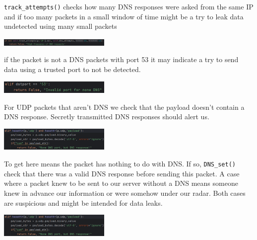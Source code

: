 \documentclass{article}
\begin{document}
\begin{itemize}
\begin{adjustwidth}{3em}{0em}
\begin{minipage}{\linewidth}
        \end{minipage}
        \texttt{track\_attempts()} checks how many DNS responses were asked from the same IP and if too many   packets in a small window of time might be a try to leak data undetected using many small packets \\
        \begin{minipage}{\linewidth}
            \includegraphics[width=0.4\textwidth]{test - dns 1.3.png}\hspace{3em}
        \end{minipage}
    \end{adjustwidth}

    if the packet is not a DNS packets with port 53 it may indicate a try to send data using a trusted port to not be detected. \\
    \begin{minipage}{\linewidth}
        \includegraphics[width=0.4\textwidth]{test - dns 2.png}\hspace{3em}
    \end{minipage}
    For UDP packets that aren’t DNS we check that the payload doesn’t contain a DNS response. Secretly transmitted DNS responses should alert us. \\
    \begin{minipage}{\linewidth}
        \includegraphics[width=0.4\textwidth]{test - dns 3.png}
    \end{minipage} 
    To get here means the packet has nothing to do with DNS. If so, \texttt{DNS\_set()} check that there was a valid DNS response before sending this packet. A case where a packet knew to be sent to our server without a DNS means someone knew in advance our information or were somehow under our radar. Both cases are suspicious and might be intended for data leaks. \\
    \begin{minipage}{\linewidth}
        \includegraphics[width=0.4\textwidth]{test - dns 3.png}

\end{minipage}
\end{itemize}
\end{document}
